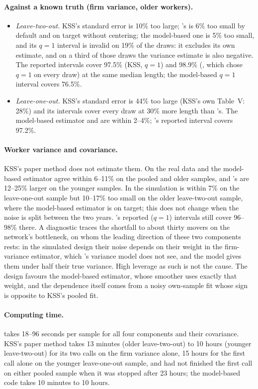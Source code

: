\paragraph{Against a known truth (firm variance, older workers).}
\begin{itemize}
\item \emph{Leave-two-out.} KSS's standard error is 10\% too large; \fevc's is 6\% too small by default and on
target without centering; the model-based one is 5\% too small, and its $q=1$ interval is invalid on 19\% of the
draws: it excludes its own estimate, and on a third of those draws the variance estimate is also negative. The reported intervals cover
97.5\% (KSS, $q=1$) and 98.9\% (\fevc, which chose $q=1$ on every draw) at the same median length; the
model-based $q=1$ interval covers 76.5\%.
\item \emph{Leave-one-out.} KSS's standard error is 44\% too large (KSS's own Table~V: 28\%) and its intervals
cover every draw at 30\% more length than \fevc's. The model-based estimator and \fevc{} are within 2--4\%;
\fevc's reported interval covers 97.2\%.
\end{itemize}

\paragraph{Worker variance and covariance.} KSS's paper method does not estimate them. On the real data \fevc{}
and the model-based estimator agree within 6--11\% on the pooled and older samples, and \fevc's are 12--25\% larger
on the younger samples. In the simulation \fevc{} is within 7\% on the leave-one-out sample but 10--17\% too small
on the older leave-two-out sample, where the model-based estimator is on target; this does not change when the
noise is split between the two years. \fevc's reported ($q=1$) intervals still cover 96--98\% there. A diagnostic
traces the shortfall to about thirty movers on the network's bottleneck, on whom the leading direction of these
two components rests: in the simulated design their noise depends on their weight in the firm-variance estimator,
which \fevc's variance model does not see, and the model gives them under half their true variance. High leverage as
such is not the cause. The design favours the model-based estimator, whose smoother uses exactly that weight, and
the dependence itself comes from a noisy own-sample fit whose sign is opposite to KSS's pooled fit.

\paragraph{Computing time.} \fevc{} takes 18--96 seconds per sample for all four components and their covariance.
KSS's paper method takes 13 minutes (older leave-two-out) to 10 hours (younger leave-two-out) for its two calls on
the firm variance alone, 15 hours for the first call alone on the younger leave-one-out sample, and had not finished
the first call on either pooled sample when it was stopped after 23 hours; the model-based code takes 10 minutes to
10 hours.

